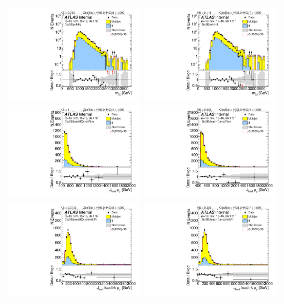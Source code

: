 \begin{figure}[htbp!]
\begin{center}
\includegraphics[width=0.31\textwidth,angle=-90]{figures/boosted/Prereweight/Moriond_ThreeTag_Sideband_mHH_l_1.pdf}
\includegraphics[width=0.31\textwidth,angle=-90]{figures/boosted/Sideband/b77_ThreeTag_Sideband_mHH_l_1.pdf}\\
\includegraphics[width=0.31\textwidth,angle=-90]{figures/boosted/Prereweight/Moriond_ThreeTag_Sideband_leadHCand_Pt_m.pdf}
\includegraphics[width=0.31\textwidth,angle=-90]{figures/boosted/Sideband/b77_ThreeTag_Sideband_leadHCand_Pt_m.pdf}\\
\includegraphics[width=0.31\textwidth,angle=-90]{figures/boosted/Prereweight/Moriond_ThreeTag_Sideband_leadHCand_trk0_Pt.pdf}
\includegraphics[width=0.31\textwidth,angle=-90]{figures/boosted/Sideband/b77_ThreeTag_Sideband_leadHCand_trk0_Pt.pdf}\\

\end{center}
\end{figure}
